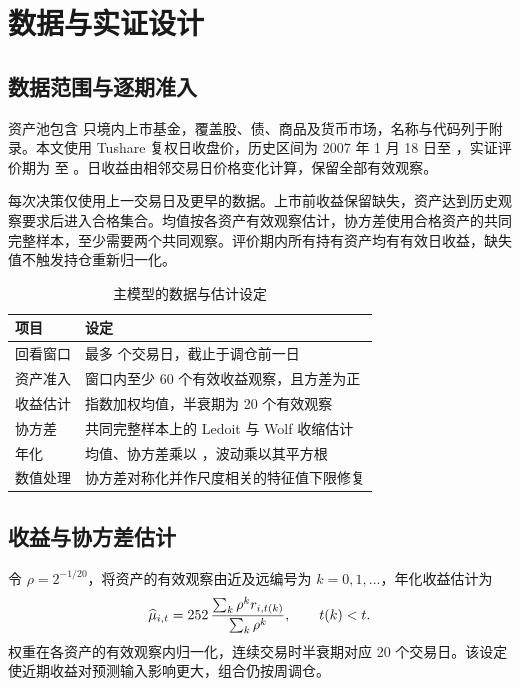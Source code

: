 \section{数据与实证设计}
\subsection{数据范围与逐期准入}
资产池包含 \etfCount{} 只境内上市基金，覆盖股、债、商品及货币市场，名称与代码列于附录。本文使用 Tushare 复权日收盘价，历史区间为 2007 年 1 月 18 日至 \evalEndDate{}，实证评价期为 \evalStartDate{} 至 \evalEndDate{}。日收益由相邻交易日价格变化计算，保留全部有效观察。

每次决策仅使用上一交易日及更早的数据。上市前收益保留缺失，资产达到历史观察要求后进入合格集合。均值按各资产有效观察估计，协方差使用合格资产的共同完整样本，至少需要两个共同观察。评价期内所有持有资产均有有效日收益，缺失值不触发持仓重新归一化。

\begin{table}[htbp]\centering
\caption{主模型的数据与估计设定}\label{tab:input_rules}
\begin{tabularx}{\textwidth}{@{}l L@{}}
\toprule 项目 & 设定\\\midrule
回看窗口 & 最多 \lookbackDays{} 个交易日，截止于调仓前一日\\
资产准入 & 窗口内至少 60 个有效收益观察，且方差为正\\
收益估计 & 指数加权均值，半衰期为 20 个有效观察\\
协方差 & 共同完整样本上的 Ledoit 与 Wolf 收缩估计\\
年化 & 均值、协方差乘以 \annualizationDays{}，波动乘以其平方根\\
数值处理 & 协方差对称化并作尺度相关的特征值下限修复\\
\bottomrule
\end{tabularx}
\end{table}

\subsection{收益与协方差估计}
\label{sec:lw}
令 $\rho=2^{-1/20}$，将资产的有效观察由近及远编号为 $k=0,1,\ldots$，年化收益估计为
\[
\widehat\mu_{i,t}=252\,
\frac{\sum_k\rho^k r_{i,t(k)}}{\sum_k\rho^k},\qquad t(k)<t.
\]
权重在各资产的有效观察内归一化，连续交易时半衰期对应 20 个交易日。该设定使近期收益对预测输入影响更大，组合仍按周调仓。

